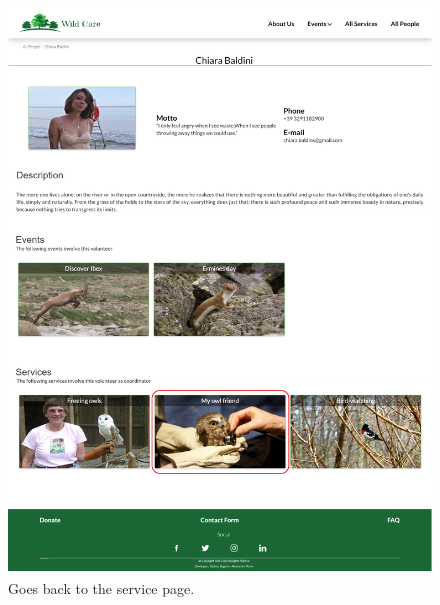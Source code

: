 	\begin{figure}[h!]
		\centering
		\begin{minipage}[b]{1\textwidth}
    			\includegraphics[width=\textwidth]{./assets/mockups/persondetails_servicedetails.png}
			\caption{Goes back to the service page.}
		\end{minipage}
	\end{figure}

